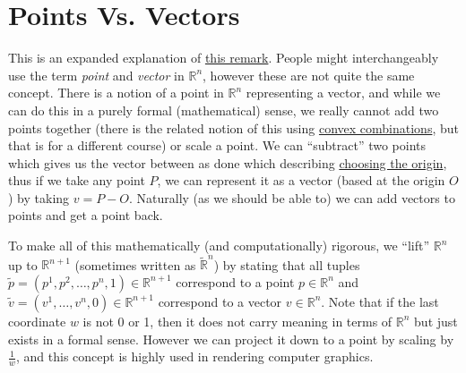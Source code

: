 \section{Points Vs. Vectors}
\label{points_vs_vectors}

This is an expanded explanation of \hyperlink{note_points_versus_vectors}{this remark}. People might interchangeably use the term \emph{point} and \emph{vector} in $\mathbb{R}^n$, however these are not quite the same concept. There is a notion of a point in $\mathbb{R}^n$ representing a vector, and while we can do this in a purely formal (mathematical) sense, we really cannot add two points together (there is the related notion of this using \href{http://en.wikipedia.org/wiki/Convex_combination}{convex combinations}, but that is for a different course) or scale a point. We can ``subtract'' two points which gives us the vector between as done which describing \hyperlink{choosing_the_origin}{choosing the origin}, thus if we take any point $P$, we can represent it as a vector (based at the origin $O$) by taking $v = P - O$. Naturally (as we should be able to) we can add vectors to points and get a point back.

To make all of this mathematically (and computationally) rigorous, we ``lift'' $\mathbb{R}^n$ up to $\mathbb{R}^{n+1}$ (sometimes written as $\widetilde{\mathbb{R}}^n$) by stating that all tuples $\widetilde{p} = (p^1, p^2, \dotsc, p^n, 1) \in \mathbb{R}^{n+1}$ correspond to a point $p \in \mathbb{R}^n$ and $\widetilde{v} = (v^1, \dotsc, v^n, 0) \in \mathbb{R}^{n+1}$ correspond to a vector $v \in \mathbb{R}^n$. Note that if the last coordinate $w$ is not 0 or 1, then it does not carry meaning in terms of $\mathbb{R}^n$ but just exists in a formal sense. However we can project it down to a point by scaling by $\frac{1}{w}$, and this concept is highly used in rendering computer graphics.

